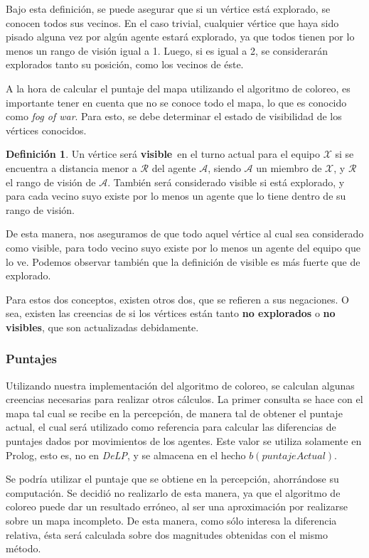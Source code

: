 \documentclass[oneside]{book}
\theoremstyle{definition}
\newtheorem{definicion}{Definición}[section]
\newcommand{\DLP}{\mbox{\textit{DeLP}}}
\newcommand{\lit}[1]{\mbox{$ #1$}}
\begin{document}
Bajo esta definición, se puede asegurar que si un vértice está explorado, se 
conocen todos sus vecinos. En el caso trivial, cualquier vértice que haya sido
pisado alguna vez por algún agente estará explorado, ya que todos tienen por lo 
menos un rango de visión igual a 1. Luego, si es igual a 2, se considerarán
explorados tanto su posición, como los vecinos de éste.

A la hora de calcular el puntaje del mapa utilizando el algoritmo de coloreo,
es importante tener en cuenta que no se conoce todo el mapa, lo que es conocido 
como \textit{fog of war}. Para esto, se debe determinar el estado de visibilidad
de los vértices conocidos. 

\begin{definicion}
Un vértice será \textbf{visible}\ en el turno actual para el equipo $\mathcal 
X$ si se encuentra a distancia menor a $\mathcal R$ del agente $\mathcal A$, 
siendo $\mathcal A$ un miembro de $\mathcal X$, y $\mathcal R$ el rango de 
visión de $\mathcal A$. También será considerado visible si está explorado, y 
para cada vecino suyo existe por lo menos un agente que lo tiene dentro de su 
rango de visión.
\end{definicion}

De esta manera, nos aseguramos de que todo aquel vértice al cual sea considerado 
como visible, para todo vecino suyo existe por lo menos un agente del equipo 
que lo ve. Podemos observar también que la definición de visible es más fuerte que
de explorado.

Para estos dos conceptos, existen otros dos, que se refieren a sus negaciones. O 
sea, existen las creencias de si los vértices están tanto \textbf{no explorados}
o \textbf{no visibles}, que son actualizadas debidamente.


\subsubsection{Puntajes}

Utilizando nuestra implementación del algoritmo de coloreo, se calculan algunas
creencias necesarias para realizar otros cálculos. La primer consulta se hace con
el mapa tal cual se recibe en la percepción, de manera tal de obtener el puntaje
actual, el cual será utilizado como referencia para calcular las diferencias de
puntajes dados por movimientos de los agentes. Este valor se utiliza solamente
en Prolog, esto es, no en \DLP, y se almacena en el hecho \lit{b(puntajeActual)}.

Se podría utilizar el puntaje que se obtiene en la percepción, ahorrándose
su computación. Se decidió no realizarlo de esta manera, ya que el algoritmo de 
coloreo puede dar un resultado erróneo, al ser una aproximación por realizarse
sobre un mapa incompleto. De esta manera, como sólo interesa la diferencia 
relativa, ésta será calculada sobre dos magnitudes obtenidas con el mismo 
método.
\end{document}
